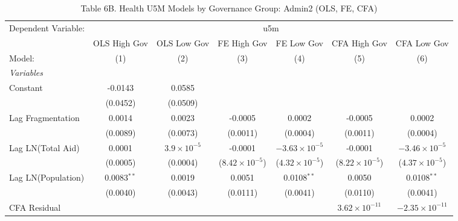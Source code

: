 \begin{table}[htbp]
   \caption{Table 6B. Health U5M Models by Governance Group: Admin2 (OLS, FE, CFA)}
   \centering
   \begin{tabular}{lcccccc}
      \tabularnewline \midrule \midrule
      Dependent Variable: & \multicolumn{6}{c}{u5m}\\
                         & OLS High Gov  & OLS Low Gov          & FE High Gov             & FE Low Gov              & CFA High Gov             & CFA Low Gov \\   
      Model:             & (1)           & (2)                  & (3)                     & (4)                     & (5)                      & (6)\\  
      \midrule
      \emph{Variables}\\
      Constant           & -0.0143       & 0.0585               &                         &                         &                          &   \\   
                         & (0.0452)      & (0.0509)             &                         &                         &                          &   \\   
      Lag Fragmentation  & 0.0014        & 0.0023               & -0.0005                 & 0.0002                  & -0.0005                  & 0.0002\\   
                         & (0.0089)      & (0.0073)             & (0.0011)                & (0.0004)                & (0.0011)                 & (0.0004)\\   
      Lag LN(Total Aid)  & 0.0001        & $3.9\times 10^{-5}$  & -0.0001                 & $-3.63\times 10^{-5}$   & -0.0001                  & $-3.46\times 10^{-5}$\\    
                         & (0.0005)      & (0.0004)             & ($8.42\times 10^{-5}$)  & ($4.32\times 10^{-5}$)  & ($8.22\times 10^{-5}$)   & ($4.37\times 10^{-5}$)\\    
      Lag LN(Population) & 0.0083$^{**}$ & 0.0019               & 0.0051                  & 0.0108$^{**}$           & 0.0050                   & 0.0108$^{**}$\\   
                         & (0.0040)      & (0.0043)             & (0.0111)                & (0.0041)                & (0.0110)                 & (0.0041)\\   
      CFA Residual       &               &                      &                         &                         & $3.62\times 10^{-11}$    & $-2.35\times 10^{-11}$\\    

\end{tabular}
\end{table}

